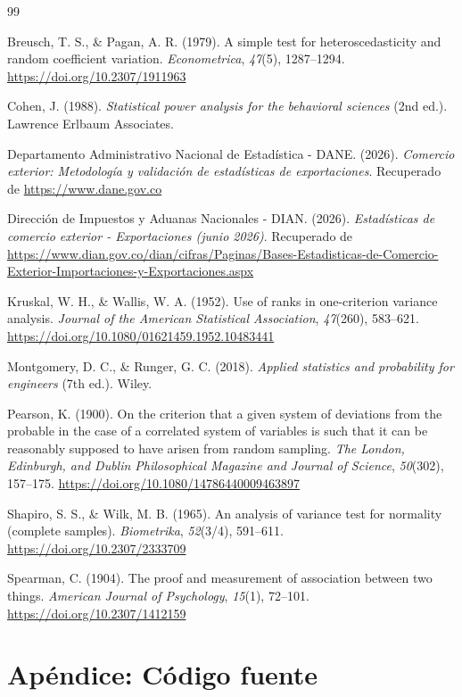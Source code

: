 \documentclass[12pt]{article}
\begin{document}
\newpage

\renewcommand{\refname}{Referencias}
\makeatletter
\renewcommand{\@biblabel}[1]{}
\makeatother
\begin{thebibliography}{99}

Breusch, T. S., \& Pagan, A. R. (1979).
A simple test for heteroscedasticity and random coefficient variation.
\emph{Econometrica}, \emph{47}(5), 1287--1294.
\url{https://doi.org/10.2307/1911963}

Cohen, J. (1988).
\emph{Statistical power analysis for the behavioral sciences} (2nd ed.).
Lawrence Erlbaum Associates.

Departamento Administrativo Nacional de Estadística - DANE. (2026).
\emph{Comercio exterior: Metodología y validación de estadísticas de exportaciones}.
Recuperado de \url{https://www.dane.gov.co}

Dirección de Impuestos y Aduanas Nacionales - DIAN. (2026).
\emph{Estadísticas de comercio exterior - Exportaciones (junio 2026)}.
Recuperado de \url{https://www.dian.gov.co/dian/cifras/Paginas/Bases-Estadisticas-de-Comercio-Exterior-Importaciones-y-Exportaciones.aspx}

Kruskal, W. H., \& Wallis, W. A. (1952).
Use of ranks in one-criterion variance analysis.
\emph{Journal of the American Statistical Association}, \emph{47}(260), 583--621.
\url{https://doi.org/10.1080/01621459.1952.10483441}

Montgomery, D. C., \& Runger, G. C. (2018).
\emph{Applied statistics and probability for engineers} (7th ed.).
Wiley.

Pearson, K. (1900).
On the criterion that a given system of deviations from the probable in
the case of a correlated system of variables is such that it can be
reasonably supposed to have arisen from random sampling.
\emph{The London, Edinburgh, and Dublin Philosophical Magazine and
Journal of Science}, \emph{50}(302), 157--175.
\url{https://doi.org/10.1080/14786440009463897}

Shapiro, S. S., \& Wilk, M. B. (1965).
An analysis of variance test for normality (complete samples).
\emph{Biometrika}, \emph{52}(3/4), 591--611.
\url{https://doi.org/10.2307/2333709}

Spearman, C. (1904).
The proof and measurement of association between two things.
\emph{American Journal of Psychology}, \emph{15}(1), 72--101.
\url{https://doi.org/10.2307/1412159}

\end{thebibliography}

\newpage

\appendix
\section{Apéndice: Código fuente}


\end{document}
